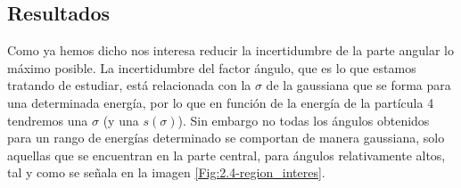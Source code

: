 \documentclass[12pt,a4paper]{article}
\numberwithin{equation}{section}
\numberwithin{figure}{section}
\begin{document}
\subsection{Resultados}

Como ya hemos dicho nos interesa reducir la incertidumbre de la parte angular lo máximo posible. La incertidumbre del factor ángulo, que es lo que estamos tratando de estudiar, está relacionada con la $\sigma$ de la gaussiana que se forma para una determinada energía, por lo que en función de la energía de la partícula 4 tendremos una $\sigma$ (y una $s(\sigma)$). Sin embargo no todas los ángulos obtenidos para un rango de energías determinado se comportan de manera gaussiana, solo aquellas que se encuentran en la parte central, para ángulos relativamente altos, tal y como se señala en la imagen \ref{Fig:2.4-region_interes}. 
\end{document}
